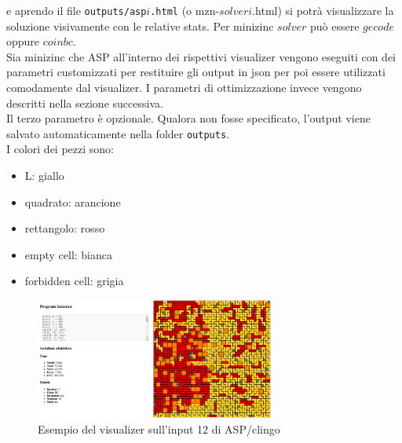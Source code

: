 \documentclass{article}
\begin{document}
e aprendo il file \texttt{outputs/asp$i$.html} (o mzn-$solver$$i$.html) si potrà visualizzare la soluzione visivamente con le relative stats. Per minizinc $solver$ può essere $gecode$ oppure $coinbc$.\\
Sia minizinc che ASP all'interno dei rispettivi visualizer vengono eseguiti con dei parametri customizzati per restituire gli output in json per poi essere utilizzati comodamente dal visualizer. I parametri di ottimizzazione invece vengono descritti nella sezione successiva.\\
Il terzo parametro è opzionale. Qualora non fosse specificato, l'output viene salvato automaticamente nella folder \texttt{outputs}.\\
I colori dei pezzi sono:
\begin{itemize}
    \item L: giallo
    \item quadrato: arancione
    \item rettangolo: rosso
    \item empty cell: bianca
    \item forbidden cell: grigia
\end{itemize}
\begin{figure}[ht!]
    \centering
    \includegraphics[width=0.7\textwidth]{images/visualizer.png}
    \caption{Esempio del visualizer sull'input 12 di ASP/clingo}
\end{figure}
\end{document}
